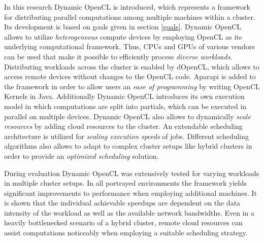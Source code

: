 In this research Dynamic OpenCL is introduced, which represents a framework for distributing parallel computations among multiple machines within a cluster. Its development is based on goals given in section \ref{goals}. Dynamic OpenCL allows to utilize \textit{heterogeneous} compute devices by employing OpenCL as its underlying computational framework. Thus, CPUs and GPUs of various vendors can be used that make it possible to efficiently process \textit{diverse workloads}. Distributing workloads across the cluster is enabled by dOpenCL, which allows to access remote devices without changes to the OpenCL code. Aparapi is added to the framework in order to allow users an \textit{ease of programming} by writing OpenCL Kernels in Java. Additionally Dynamic OpenCL introduces its own execution model in which computations are split into partials, which can be executed in parallel on multiple devices. Dynamic OpenCL also allows to dynamically \textit{scale resources} by adding cloud resources to the cluster. An extendable scheduling architecture is utilized for \textit{scaling execution speeds} of jobs. Different scheduling algorithms also allows to adapt to complex cluster setups like hybrid clusters in order to provide an \textit{optimized scheduling} solution.

During evaluation Dynamic OpenCL was extensively tested for varying workloads in multiple cluster setups. In all portrayed environments the framework yields significant improvements to performance when employing additional machines. It is shown that the individual achievable speedups are dependent on the data intensity of the workload as well as the available network bandwidths. Even in a heavily bottlenecked scenario of a hybrid cluster, remote cloud resources can assist computations noticeably when employing a suitable scheduling strategy.

